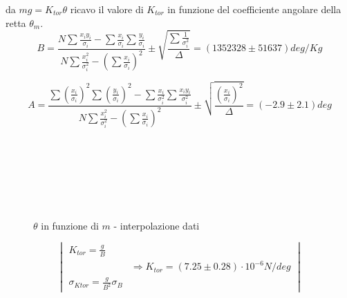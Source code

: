 \documentclass[a4paper]{article}
\theoremstyle{definition}
\begin{document}
\noindent da \(mg = K_{tor}\theta\) ricavo il valore di \(K_{tor}\) in funzione del coefficiente angolare della retta \(\theta_{m}\).\\
\[B = \frac{N\sum \frac{x_{i}y_{i}}{\sigma _{i}}-\sum \frac{x_{i}}{\sigma _{i}}\sum \frac{y_{i}}{\sigma _{i}}}{N\sum \frac{x_{i}^{2}}{\sigma _{i}^{2}}-(\sum\frac{x_{i}}{\sigma _{i}} )^{2}} \pm \sqrt{\frac{\sum \frac{1}{\sigma _{i}^{2}}}{\Delta }} = (1352328 \pm 51637) deg/Kg\]

\[A = \frac{\sum(\frac{x_{i}}{\sigma _{i}})^{2}\sum(\frac{y_{i}}{\sigma _{i}})^{2}-\sum \frac{x_{i}}{\sigma _{i}^{2}}\sum \frac{x_{i}y_{i}}{\sigma _{i}^{2}}}{N\sum \frac{x_{i}^{2}}{\sigma _{i}^{2}}-(\sum\frac{x_{i}}{\sigma _{i}} )^{2}} \pm \sqrt{\frac{(\frac{x_{i}}{\sigma _{i}})^{2}}{\Delta }} = (-2.9 \pm 2.1) deg\]\\\\\\\\\\\\

\begin{figure}[!htbp]
	\captionsetup{labelformat=empty}
	\caption{\(\theta\) in funzione di \(m\) - interpolazione dati}
\end{figure}


\[\begin{vmatrix}
	K_{tor} = \frac{g}{B} & \\ 
	& \Rightarrow K_{tor} = (7.25 \pm 0.28) \cdot 10^{-6} N/deg\\ 
	\sigma_{Ktor} = \frac{g}{B^{2}}\sigma_{B} & 
\end{vmatrix}\]
\end{document}

